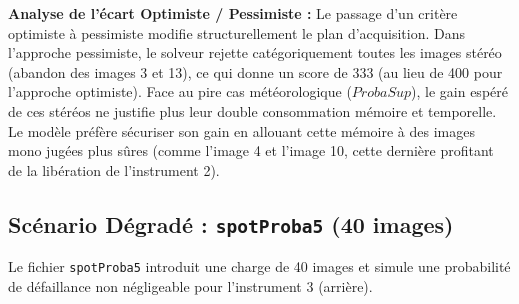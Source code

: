 \documentclass[8pt]{article}
\begin{document}
\textbf{Analyse de l'écart Optimiste / Pessimiste :} 
Le passage d'un critère optimiste à pessimiste modifie structurellement le plan d'acquisition. Dans l'approche pessimiste, le solveur rejette catégoriquement toutes les images stéréo (abandon des images 3 et 13), ce qui donne un score de 333 (au lieu de 400 pour l'approche optimiste). Face au pire cas météorologique ($ProbaSup$), le gain espéré de ces stéréos ne justifie plus leur double consommation mémoire et temporelle. Le modèle préfère sécuriser son gain en allouant cette mémoire à des images mono jugées plus sûres (comme l'image 4 et l'image 10, cette dernière profitant de la libération de l'instrument 2).

\subsection{Scénario Dégradé : \texttt{spotProba5} (40 images)}

Le fichier \texttt{spotProba5} introduit une charge de 40 images et simule une probabilité de défaillance non négligeable pour l'instrument 3 (arrière).
\end{document}
